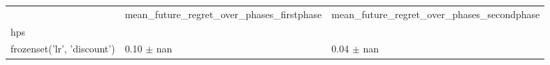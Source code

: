 \begin{tabular}{lll}
\toprule
 & mean_future_regret_over_phases_firstphase & mean_future_regret_over_phases_secondphase \\
hps &  &  \\
\midrule
frozenset({'lr', 'discount'}) & 0.10 $\pm$ nan & 0.04 $\pm$ nan \\
\bottomrule
\end{tabular}
